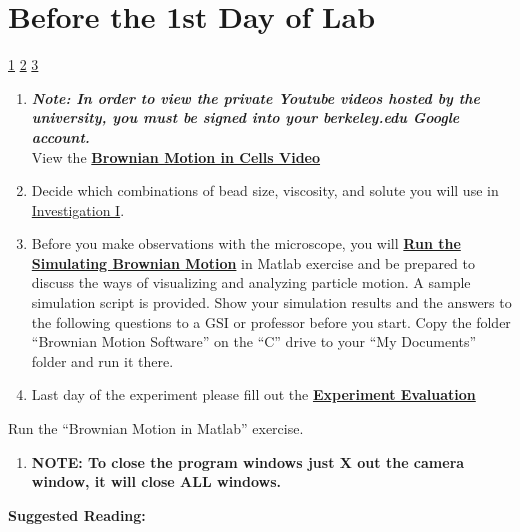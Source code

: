 \documentclass{../lab}
\begin{document}
\section{Before the 1st Day of Lab}

\signatures \hyperlink{Dark-Field Illumination}{ 1} \hyperlink{Data Analysis Additional Questions}{ 2} \hyperlink{Cellular Motion Additional Questions}{ 3} 

\begin{enumerate}
    \item \emph{\textbf{Note: In order to view the private Youtube videos hosted by the university, you must be signed into your berkeley.edu Google account.}} \\
    View the \href{http://youtu.be/XJ6YBTL6euc}{\textbf{Brownian Motion in Cells Video}}

    \item Decide which combinations of bead size, viscosity, and solute you will use in  \hyperref[sec:InvestigationI]{Investigation I}.

    \item Before you make observations with the microscope, you will \href{http://experimentationlab.berkeley.edu/node/83}{\textbf{Run the Simulating Brownian Motion}} in Matlab exercise and be prepared to discuss the ways of visualizing and analyzing particle motion.  A sample simulation script is provided. Show your simulation results and the answers to the following questions to a GSI or professor before you start. Copy the folder ``Brownian Motion Software'' on the ``C'' drive to your ``My Documents'' folder and run it there.

    \item Last day of the experiment please fill out the \href{\ExperimentEvaluation}{\textbf{Experiment Evaluation}}
\end{enumerate}

Run the ``Brownian Motion in Matlab'' exercise.

\begin{enumerate}
    \item \textbf{NOTE: To close the program windows just X out the camera window, it will close ALL windows.}
\end{enumerate}

\textbf{Suggested Reading:}
\end{document}
